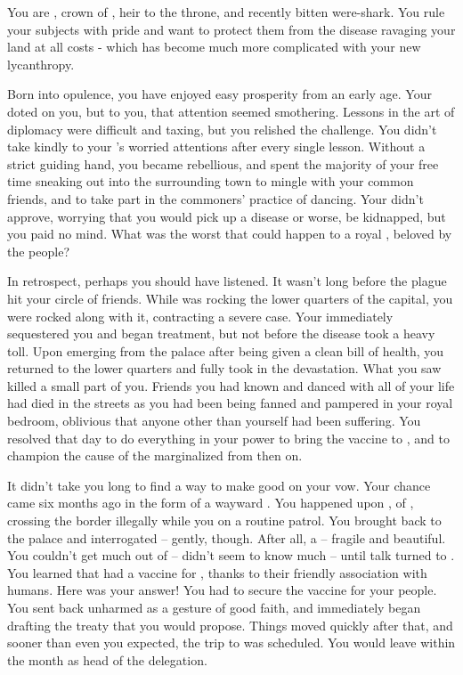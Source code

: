 \documentclass[char]{NeptuneBall}
\begin{document}
\name{\cPrince{}}

You are \cPrince{}, crown \cPrince{\prince} of \pPacifica{}, heir to the throne, and recently bitten were-shark. You rule your subjects with pride and want to protect them from the disease ravaging your land at all costs - which has become much more complicated with your new lycanthropy.

Born into opulence, you have enjoyed easy prosperity from an early age. Your \cPacificanRuler{\parent} \cPacificanRuler{\King} \cPacificanRuler{} doted on you, but to you, that attention seemed smothering. Lessons in the art of diplomacy were difficult and taxing, but you relished the challenge. You didn't take kindly to your \cPacificanRuler{\parent}'s worried attentions after every single lesson. Without a strict guiding hand, you became rebellious, and spent the majority of your free time sneaking out into the surrounding town to mingle with your common friends, and to take part in the commoners' practice of dancing. Your \cPacificanRuler{\parent} didn't approve, worrying that you would pick up a disease or worse, be kidnapped, but you paid \cPacificanRuler{\them} no mind. What was the worst that could happen to a royal \cPrince{\prince}, beloved by the people?

In retrospect, perhaps you should have listened. It wasn't long before the plague hit your circle of friends. While \ppolio{} was rocking the lower quarters of the capital, you were rocked along with it, contracting a severe case. Your \cPacificanRuler{\parent} immediately sequestered you and began treatment, but not before the disease took a heavy toll. Upon emerging from the palace after being given a clean bill of health, you returned to the lower quarters and fully took in the devastation. What you saw killed a small part of you. Friends you had known and danced with all of your life had died in the streets as you had been being fanned and pampered in your royal bedroom, oblivious that anyone other than yourself had been suffering. You resolved that day to do everything in your power to bring the vaccine to \pPacifica{}, and to champion the cause of the marginalized from then on.

It didn't take you long to find a way to make good on your vow. Your chance came six months ago in the form of a wayward \cPrincess{\waif}. You happened upon \cPrincess{}, \cPrincess{\prince} of \pAtlantis{}, crossing the border illegally while you on a routine patrol. You brought \cPrincess{\them} back to the palace and interrogated \cPrincess{\them} -- gently, though. After all, \cPrincess{\they} \cPrincess{\were} a \cPrincess{\prince} -- fragile and beautiful. You couldn't get much out of \cPrincess{\them} -- \cPrincess{\they} didn't seem to know much -- until talk turned to \ppolio{}. You learned that \pAtlantis{} had a vaccine for \ppolio{}, thanks to their friendly association with humans. Here was your answer! You had to secure the vaccine for your people.  You sent \cPrincess{} back unharmed as a gesture of good faith, and immediately began drafting the treaty that you would propose. Things moved quickly after that, and sooner than even you expected, the trip to \pAtlantis{} was scheduled. You would leave within the month as head of the delegation.
\end{document}
